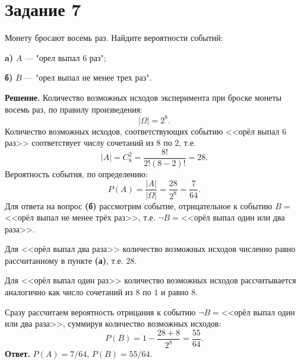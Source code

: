 \documentclass[a4paper,12pt]{article}
\begin{document}
\section*{Задание 7}
Монету бросают восемь раз. Найдите вероятности событий:

{\bf a)} $A$ --- "орел выпал 6 раз";


{\bf б)} $B$ --- "орел выпал не менее трех раз".

{\noindent \bf Решение.} Количество возможных исходов эксперимента при броске монеты восемь раз, по правилу произведения:
$$|\Omega| = 2^8.$$
Количество возможных исходов, соответствующих событию <<орёл выпал 6 раз>> соответствует числу сочетаний из $8$ по $2$, т.е. 
$$|A|=C_8^2=\frac{8!}{2!(8-2)!}=28.$$
Вероятность события, по определению:
$$P(A)=\frac{|A|}{|\Omega|}=\frac{28}{2^8}=\frac{7}{64}.$$
Для ответа на вопрос {\bf(б)} рассмотрим событие, отрицательное к событию $B=$<<орёл выпал не менее трёх раз>>, т.е. $\neg B=$<<орёл выпал один или два раза>>.\par
Для <<орёл выпал два раза>> количество возможных исходов численно равно рассчитанному в пункте {\bf(а)}, т.е. $28$.\par 
Для <<орёл выпал один раз>> количество возможных исходов рассчитывается аналогично как число сочетаний из $8$ по $1$ и равно $8$. \par
Сразу рассчитаем вероятность отрицания к событию $\neg B=$<<орёл выпал один или два раза>>, суммируя количество возможных исходов:
$$P(B)=1-\frac{28+8}{2^8}=\frac{55}{64}.$$ 
{\bf Ответ.} $P(A)=7/64$, $P(B)=55/64$. \par
\end{document}
